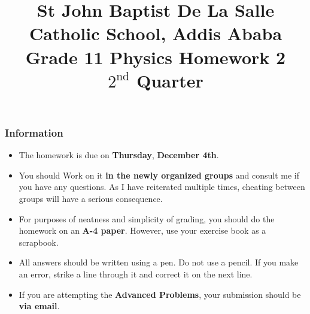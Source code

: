 \documentclass[12pt,addpoints]{exam}
\begin{document}
	\title{St John Baptist De La Salle Catholic School, Addis Ababa\\
		\large Grade 11 Physics Homework 2\\
		$2^\text{nd}$ Quarter}
	\maketitle
	\begin{center}
		\subsubsection*{Information}
		\begin{itemize}
			\item The homework is due on \textbf{Thursday}, \textbf{December 4th}.
			\item You should Work on it \textbf{in the newly organized groups} and consult me if you have any questions. As I have reiterated multiple times, cheating between groups will have a serious consequence.
			\item For purposes of neatness and simplicity of grading, you should do the homework on an \textbf{A-4 paper}. However, use your exercise book as a scrapbook.
			\item All answers should be written using a pen. Do not use a pencil. If you make an error, strike a line through it and correct it on the next line.
			\item If you are attempting the \textbf{Advanced Problems}, your submission should be \textbf{via email}.
		\end{itemize}
	\end{center}
	\newpage
\end{document}
